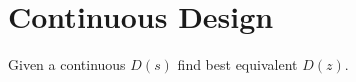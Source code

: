 \begin{slide}\label{slide:l12s4}
  \begin{center}
  \end{center}
\end{slide}


\section*{Continuous Design}

\begin{slide}
	Given a continuous $D(s)$ find best equivalent $D(z)$.
	\begin{center}
	\end{center}
\end{slide}

